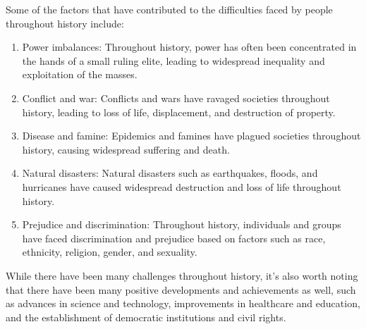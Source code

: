 \documentclass[
]{article}
\begin{document}
Some of the factors that have contributed to the difficulties faced by
people throughout history include:

\begin{enumerate}
\def\labelenumi{\arabic{enumi}.}
\item
  Power imbalances: Throughout history, power has often been
  concentrated in the hands of a small ruling elite, leading to
  widespread inequality and exploitation of the masses.
\item
  Conflict and war: Conflicts and wars have ravaged societies throughout
  history, leading to loss of life, displacement, and destruction of
  property.
\item
  Disease and famine: Epidemics and famines have plagued societies
  throughout history, causing widespread suffering and death.
\item
  Natural disasters: Natural disasters such as earthquakes, floods, and
  hurricanes have caused widespread destruction and loss of life
  throughout history.
\item
  Prejudice and discrimination: Throughout history, individuals and
  groups have faced discrimination and prejudice based on factors such
  as race, ethnicity, religion, gender, and sexuality.
\end{enumerate}

While there have been many challenges throughout history, it's also
worth noting that there have been many positive developments and
achievements as well, such as advances in science and technology,
improvements in healthcare and education, and the establishment of
democratic institutions and civil rights.
\end{document}
